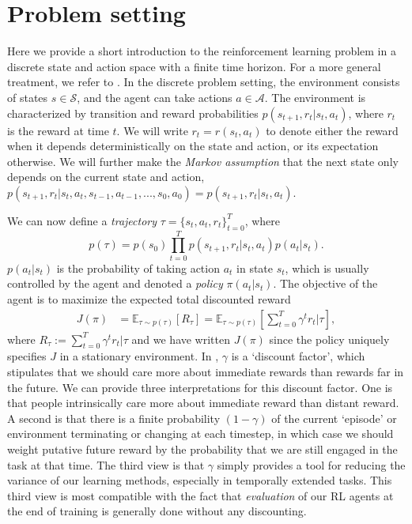 \section{Problem setting}
\label{sec:problem_setting}

Here we provide a short introduction to the reinforcement learning problem in a discrete state and action space with a finite time horizon.
For a more general treatment, we refer to \citet{sutton2018reinforcement}.
In the discrete problem setting, the environment consists of states $s \in \mathcal{S}$, and the agent can take actions $a \in \mathcal{A}$.
The environment is characterized by transition and reward probabilities $p(s_{t+1}, r_t | s_t, a_t)$, where $r_t$ is the reward at time $t$.
We will write $r_t = r(s_t, a_t)$ to denote either the reward when it depends deterministically on the state and action, or its expectation otherwise.
We will further make the \emph{Markov assumption} that the next state only depends on the current state and action, $p(s_{t+1}, r_t | s_t, a_t, s_{t-1}, a_{t-1}, ..., s_0, a_0) = p(s_{t+1}, r_t | s_t, a_t)$.

We can now define a \emph{trajectory} $\tau = \{ s_t, a_t, r_t \}_{t = 0}^T$, where
\begin{equation}
    p(\tau) = p(s_0) \prod_{t = 0}^T p(s_{t+1}, r_t | s_t, a_t) p(a_t|s_t).
\end{equation}
$p(a_t|s_t)$ is the probability of taking action $a_t$ in state $s_t$, which is usually controlled by the agent and denoted a \emph{policy} $\pi(a_t|s_t)$.
The objective of the agent is to maximize the expected total discounted reward
\begin{align}
    \label{eq:RL_objective}
    J(\pi) &= \mathbb{E}_{\tau \sim p(\tau)} \left [ R_\tau \right ] = \mathbb{E}_{\tau \sim p(\tau)} \left [ \sum_{t=0}^T \gamma^t r_t | \tau \right ],
\end{align}
where $R_\tau := \sum_{t=0}^T \gamma^t r_t | \tau$ and we have written $J(\pi)$ since the policy uniquely specifies $J$ in a stationary environment.
In , $\gamma$ is a `discount factor', which stipulates that we should care more about immediate rewards than rewards far in the future.
We can provide three interpretations for this discount factor.
One is that people intrinsically care more about immediate reward than distant reward.
A second is that there is a finite probability $(1-\gamma)$ of the current `episode' or environment terminating or changing at each timestep, in which case we should weight putative future reward by the probability that we are still engaged in the task at that time.
The third view is that $\gamma$ simply provides a tool for reducing the variance of our learning methods, especially in temporally extended tasks.
This third view is most compatible with the fact that \emph{evaluation} of our RL agents at the end of training is generally done without any discounting.


